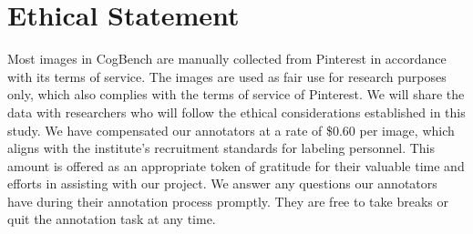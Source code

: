 


\section*{Ethical Statement}
\label{sec:ethical}

Most images in CogBench are manually collected from Pinterest in accordance with its terms of service.
The images are used as fair use for research purposes only, which also complies with the terms of service of Pinterest.
We will share the data with researchers who will follow the ethical considerations established in this study.
We have compensated our annotators at a rate of \$0.60 per image, which aligns with the institute's recruitment standards for labeling personnel. 
This amount is offered as an appropriate token of gratitude for their valuable time and efforts in assisting with our project.
We answer any questions our annotators have during their annotation process promptly. 
They are free to take breaks or quit the annotation task at any time.